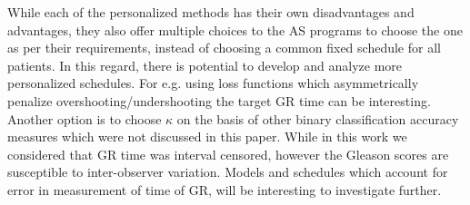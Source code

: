 While each of the personalized methods has their own disadvantages and advantages, they also offer multiple choices to the AS programs to choose the one as per their requirements, instead of choosing a common fixed schedule for all patients. In this regard, there is potential to develop and analyze more personalized schedules. For e.g. using loss functions which asymmetrically penalize overshooting/undershooting the target GR time can be interesting. Another option is to choose $\kappa$ on the basis of other binary classification accuracy measures which were not discussed in this paper. While in this work we considered that GR time was interval censored, however the Gleason scores are susceptible to inter-observer variation. Models and schedules which account for error in measurement of time of GR, will be interesting to investigate further. 

